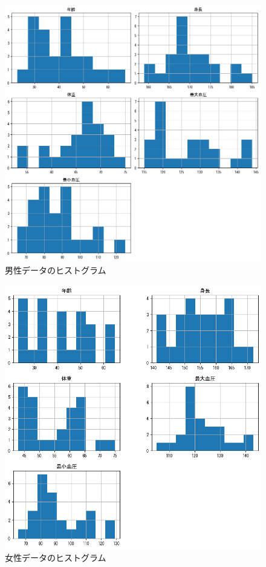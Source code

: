 \documentclass[dvipdfmx]{jsarticle}
\begin{document}
    \begin{figure}[H]
        \centering
        \includegraphics[scale=0.6]{./images/male/hist.png}
        \caption{男性データのヒストグラム}
    \end{figure}
    \begin{figure}[H]
        \centering
        \includegraphics[scale=0.6]{./images/female/hist.png}
        \caption{女性データのヒストグラム}
    \end{figure}
\end{document}
